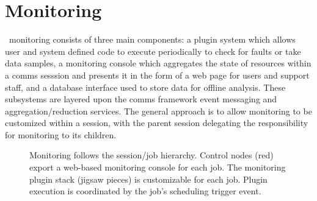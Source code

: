 \section{Monitoring}

\ngrm\ monitoring consists of three main components:
a plugin system which allows user and system defined code to execute
periodically to check for faults or take data samples,
a monitoring console which aggregates the state of resources within a
comms sesssion and presents it in the form of a web page for users and
support staff, and a database interface used to store data for
offline analysis.
These subsystems are layered upon the comms framework event messaging and
aggregation/reduction services.  The general approach is to allow monitoring
to be customized within a session, with the parent session delegating
the responsibility for monitoring to its children.

\begin{figure}
\begin{minipage}[b]{0.4\linewidth}
\end{minipage}
\hspace{1cm}
\begin{minipage}[b]{0.4\linewidth}
\end{minipage}
\caption{Monitoring follows the session/job hierarchy.
Control nodes (red) export a web-based monitoring console for each job.
The monitoring plugin stack (jigsaw pieces) is customizable for each job.
Plugin execution is coordinated by the job's scheduling trigger event.}
\label{FigMonEx1}
\end{figure}

